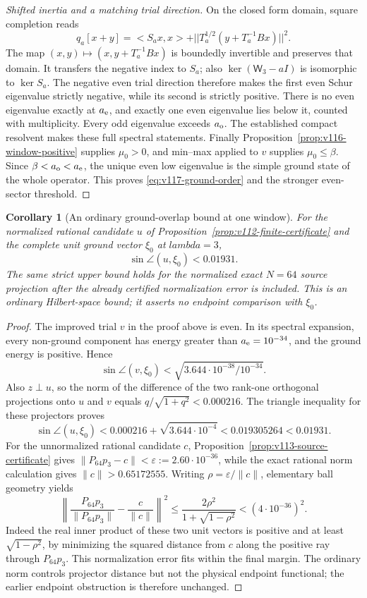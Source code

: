 \documentclass[11pt]{article}
\def\lambda{lambda}%
\def\norm#1{||#1||}%
\def\ip#1#2{<#1,#2>}%
\newtheorem{corollary}[theorem]{Corollary}
\theoremstyle{remark}
\newcommand{\norm}[1]{\left\lVert #1\right\rVert}
\newcommand{\ip}[2]{\left\langle #1,#2\right\rangle}
\begin{document}
\begin{proof}[Shifted inertia and a matching trial direction]
On the closed form domain, square completion reads
\[
 q_a[x+y]=\ip{S_ax}{x}
       +\norm{T_a^{1/2}(y+T_a^{-1}Bx)}^2.
\]
The map $(x,y)\mapsto(x,y+T_a^{-1}Bx)$ is boundedly invertible and
preserves that domain.  It transfers the negative index to $S_a$;
also $\ker(\mathsf W_3-aI)$ is isomorphic to $\ker S_a$.
The negative even trial direction therefore makes the first even
Schur eigenvalue strictly negative, while its second is strictly
positive.  There is no even eigenvalue exactly at $a_{\rm e}$, and
exactly one even eigenvalue lies below it, counted with multiplicity.
Every odd eigenvalue exceeds $a_{\rm o}$.  The established compact
resolvent makes these full spectral statements.  Finally
Proposition~\ref{prop:v116-window-positive} supplies $\mu_0>0$,
and min--max applied to $v$ supplies $\mu_0\le\beta$.
Since $\beta<a_{\rm o}<a_{\rm e}$, the unique even low eigenvalue is
the simple ground state of the whole operator.  This proves
\eqref{eq:v117-ground-order} and the stronger even-sector threshold.
\end{proof}

\begin{corollary}[An ordinary ground-overlap bound at one window]
\label{cor:v117-ground-overlap}
For the normalized rational candidate $u$ of
Proposition~\ref{prop:v112-finite-certificate} and the complete unit
ground vector $\xi_0$ at $\lambda=3$,
\[
 \sin\angle(u,\xi_0)<0.01931.
\]
The same strict upper bound holds for the normalized exact $N=64$
source projection after the already certified normalization error is
included.  This is an ordinary Hilbert-space bound; it asserts no
endpoint comparison with $\xi_0$.
\end{corollary}
\begin{proof}
The improved trial $v$ in the proof above is even.  In its spectral
expansion, every non-ground component has energy greater than
$a_{\rm e}=10^{-34}$, and the ground energy is positive.  Hence
\[
 \sin\angle(v,\xi_0)
 <\sqrt{3.644\cdot10^{-38}/10^{-34}}.
\]
Also $z\perp u$, so the norm of the difference of the two rank-one
orthogonal projections onto $u$ and $v$ equals
$q/\sqrt{1+q^2}<0.000216$.  The triangle inequality for these
projectors proves
\[
 \sin\angle(u,\xi_0)
 <0.000216+\sqrt{3.644\cdot10^{-4}}
 <0.019305264<0.01931.
\]
For the unnormalized rational candidate $c$,
Proposition~\ref{prop:v113-source-certificate} gives
$\|P_{64}p_3-c\|<\varepsilon:=2.60\cdot10^{-36}$, while the
exact rational norm calculation gives $\|c\|>0.65172555$.
Writing $\rho=\varepsilon/\|c\|$, elementary ball geometry yields
\[
 \left\|\frac{P_{64}p_3}{\|P_{64}p_3\|}-\frac c{\|c\|}\right\|^2
 \le\frac{2\rho^2}{1+\sqrt{1-\rho^2}}<(4\cdot10^{-36})^2.
\]
Indeed the real inner product of these two unit vectors is positive
and at least $\sqrt{1-\rho^2}$, by minimizing the squared distance
from $c$ along the positive ray through $P_{64}p_3$.
This normalization error fits within the final margin.  The ordinary
norm controls projector distance but not the physical endpoint
functional; the earlier endpoint obstruction is therefore unchanged.
\end{proof}
\end{document}
